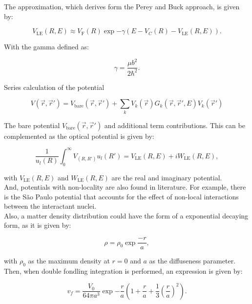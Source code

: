 \documentclass[openany]{book}
\begin{document}
The approximation, which derives form the Perey and Buck approach, is given by: 

\begin{equation}\label{potential_nonLocal_LE}
	V_\mathrm{LE}(R, E) \approx V_\mathrm{F}(R) \exp {-\gamma (E - V_C(R) -V_\mathrm{LE}(R, E))}.
\end{equation}

With the gamma defined as:

\begin{equation}\label{potential_nonLocal_b}
	\gamma = \frac{\mu b^2}{2\hbar^2}.
\end{equation}

Series calculation of the potential

\begin{equation}\label{potential_nonLocal_seriesV}
	V(\vec r, \vec r') = V_{\mathrm{bare}}(\vec r, \vec r') + \sum_k{V_k(\vec r)G_k (\vec r, \vec r', E)V_k(\vec r') }
\end{equation}

The bare potential $V_{\mathrm{bare}}(\vec r, \vec r') $ and additional term contributions.  This can be complemented as the optical potential is given by:


\begin{equation}\label{potential_nonLocal_optical}
	\frac{1}{u_l(R)} 	\int_{0}^{\infty} {V_(R, R') u_l(R')} = V_\mathrm{LE}(R, E) + i W_\mathrm{LE}(R, E), 
\end{equation}

with $V_\mathrm{LE}(R, E)$ and $W_\mathrm{LE}(R, E)$ are the real and imaginary potential.\\

And, potentials with non-locality are also found in literature. For example, there is the São Paulo potential that accounts for the effect of non-local interactions between the interactant nuclei. \\

Also, a matter density distribution could have the form of a exponential decaying form, as it is given by:

\begin{equation}\label{potential_nonLocal_density_exp}
	\rho = \rho_0 \exp{\frac{-r}{a}},
\end{equation}

with $\rho_0$ as the maximum density at $r = 0$ and $a$ as the diffuseness parameter. Then, when double fondling integration is performed, an expression is given by:

\begin{equation}\label{potential_nonLocal_density_vf}
	v_f = \frac{V_0}{64\pi a^3} \exp {-\frac{r}{a}} \left(1 + \frac{r}{a} + \frac{1}{3} \left(\frac{r}{a}\right)^2 \right).
\end{equation}
\end{document}
